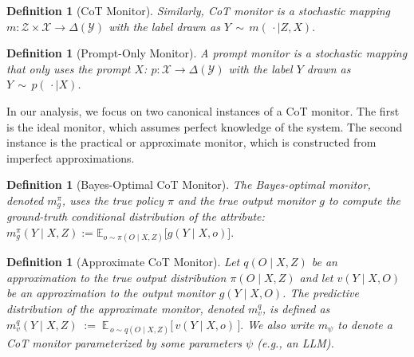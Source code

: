 \documentclass{article}
\theoremstyle{plain}
\newtheorem{definition}[theorem]{Definition}
\begin{document}
\begin{definition}[CoT Monitor]
Similarly, CoT \emph{monitor} is a stochastic mapping
\(
m:\mathcal Z \times \mathcal X\to\Delta(\mathcal Y)
\) with the label drawn as
\(Y \,\sim\, m(\,\cdot \mid Z, X).
\)
\end{definition}


\begin{definition}[Prompt-Only Monitor]
A prompt \emph{monitor} is a stochastic mapping that only uses the prompt $X$:
\(p:\mathcal{X}\to \Delta(\mathcal Y)\) with the label \(Y\) drawn as
\(Y \,\sim\, p(\,\cdot \mid X)\).
\end{definition}

In our analysis, we focus on two canonical instances of a CoT monitor. The first is the ideal monitor,
which assumes perfect knowledge of the system.
The second instance is the practical or approximate monitor, which is constructed from imperfect approximations.

\begin{definition}[Bayes-Optimal CoT Monitor]
\label{def:bayes_optimal_cot_monitor}
The \emph{Bayes-optimal monitor}, denoted $m_g^{\pi}$, uses the true policy $\pi$ and the true output monitor $g$ to compute the ground-truth conditional distribution of the attribute:
\(
m_g^{\pi}(Y\mid X,Z):=\mathbb{E}_{o\sim \pi(O\mid X,Z)}\!\big[g(Y\mid X,o)\big]. 
\)
\end{definition}

\begin{definition}[Approximate CoT Monitor]
\label{def:approximate-monitor}
Let \(q(O\mid X,Z)\) be an approximation to the true output distribution \(\pi(O\mid X,Z)\) and let \(v(Y\mid X,O)\) be an approximation to the output monitor \(g(Y\mid X,O)\). The predictive distribution of the \emph{approximate monitor}, denoted \(m_v^q\), is defined as
\(
m_{v}^{q}(Y\mid X,Z)\;:=\;\mathbb{E}_{\,o\sim q(O\mid X,Z)}\!\big[\,v(Y\mid X,o)\,\big].
\)
We also write \(m_\psi\) to denote a CoT monitor parameterized by some parameters \(\psi\) (e.g., an LLM).
\end{definition}
\end{document}
